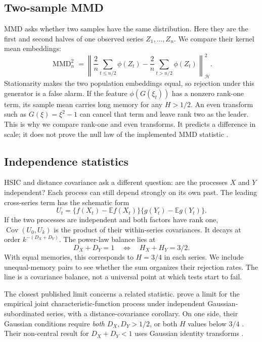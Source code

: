 \documentclass[11pt]{article}
\theoremstyle{remark}
\newcommand{\MMD}{\operatorname{MMD}}
\newcommand{\E}{\mathbb E}
\newcommand{\Cov}{\operatorname{Cov}}
\begin{document}
\subsection{Two-sample MMD}
MMD asks whether two samples have the same distribution. Here they are the first and second halves of one observed series $Z_1,\ldots,Z_n$. We compare their kernel mean embeddings:
\begin{equation}\label{eq:mmd}
\MMD_n^2=\left\|\frac{2}{n}\sum_{t\leq n/2}\phi(Z_t)
-\frac{2}{n}\sum_{t>n/2}\phi(Z_t)\right\|_{\mathcal H}^2.
\end{equation}
Stationarity makes the two population embeddings equal, so rejection under this generator is a false alarm. If the feature $\phi(G(\xi_t))$ has a nonzero rank-one term, its sample mean carries long memory for any $H>1/2$. An even transform such as $G(\xi)=\xi^2-1$ can cancel that term and leave rank two as the leader. This is why we compare rank-one and even transforms. It predicts a difference in scale; it does not prove the null law of the implemented MMD statistic \citep{dehling2017twosample}.

\subsection{Independence statistics}
HSIC and distance covariance ask a different question: are the processes $X$ and $Y$ independent? Each process can still depend strongly on its own past. The leading cross-series term has the schematic form
\begin{equation}\label{eq:cross}
 U_t=\{f(X_t)-\E f(X_t)\}\{g(Y_t)-\E g(Y_t)\}.
\end{equation}
If the two processes are independent and both factors have rank one, $\Cov(U_0,U_k)$ is the product of their within-series covariances. It decays at order $k^{-(D_X+D_Y)}$. The power-law balance lies at
\begin{equation}\label{eq:sum}
D_X+D_Y=1 \quad\Longleftrightarrow\quad H_X+H_Y=3/2.
\end{equation}
With equal memories, this corresponds to $H=3/4$ in each series. We include unequal-memory pairs to see whether the sum organizes their rejection rates. The line is a covariance balance, not a universal point at which tests start to fail.

The closest published limit concerns a related statistic. \citet{betken2021ldr} prove a limit for the empirical joint characteristic-function process under independent Gaussian-subordinated series, with a distance-covariance corollary. On one side, their Gaussian conditions require \emph{both} $D_X,D_Y>1/2$, or both $H$ values below $3/4$ \citep[Theorem 2.2(i) and Corollary 2.1(i)]{betken2021ldr}. Their non-central result for $D_X+D_Y<1$ uses Gaussian identity transforms \citep[Theorem 2.2(ii) and Corollary 2.1(ii)]{betken2021ldr}.
\end{document}
